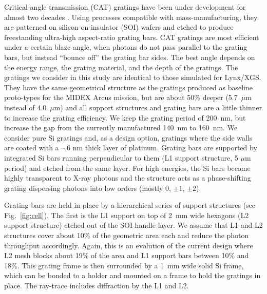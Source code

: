 \documentclass[12pt]{spieman}  %
\begin{document}
\begin{spacing}{1}
\label{sect:CAT}
Critical-angle transmission (CAT) gratings have been under development for almost two decades \cite{doi:10.1116/1.2779048,doi:10.1117/12.739941,doi:10.1116/1.2968613,doi:10.1116/1.3507427,doi:10.1116/1.4755815,doi:10.1117/12.2024357,doi:10.1116/1.4820901,doi:10.1116/1.4966595}.
Using processes compatible with mass-manufacturing, they are patterned on silicon-on-insulator (SOI) wafers and etched \cite{heilmann:11,doi:10.1117/12.2188525} to produce freestanding ultra-high aspect-ratio grating bars. CAT gratings are most efficient under a certain blaze angle, when photons do not pass parallel to the grating bars, but instead ``bounce off'' the grating bar sides. The best angle depends on the energy range, the grating material, and the depth of the gratings.
The gratings we consider in this study are identical to those simulated for Lynx/XGS\cite{10.1117/1.JATIS.5.2.021003}. They have the same geometrical structure as the gratings produced as baseline proto-types for the MIDEX Arcus mission, but are about 50\% deeper (5.7~$\mu$m instead of 4.0~$\mu$m) and all support structures and grating bars are a little thinner to increase the grating efficiency. We keep the grating period of 200~nm, but increase the gap from the currently manufactured 140~nm to 160~nm. We consider pure Si gratings and, as a design option, gratings where the side walls are coated with a $\sim 6$ nm thick layer of platinum\cite{doi:10.1117/12.2232955}. Grating bars are supported by integrated Si bars running perpendicular to them (L1 support structure, 5 $\mu$m period) and etched from the same layer.
For high energies, the Si bars become highly transparent to X-ray photons and the structure acts as a phase-shifting grating dispersing photons into low orders (mostly 0, $\pm1$, $\pm2$).

Grating bars are held in place by a hierarchical series of support structures (see Fig.~\ref{fig:cell}). The first is the
L1 support on top of 2~mm wide hexagons (L2 support
structure) etched out of the SOI handle layer.  We assume that L1 and L2 structures cover about 10\% of the geometric area
each and reduce the photon throughput accordingly. Again, this is an evolution of the current design where L2 mesh blocks about 19\% of the area and L1 support bars between 10\% and 18\%. This grating frame is then surrounded by a 1~mm wide solid Si frame, which can be bonded to a holder and mounted on a frame to hold the gratings in place.
The ray-trace includes diffraction by the L1 and L2\cite{10.1117/12.2525814}.


\end{spacing}
\end{document}
